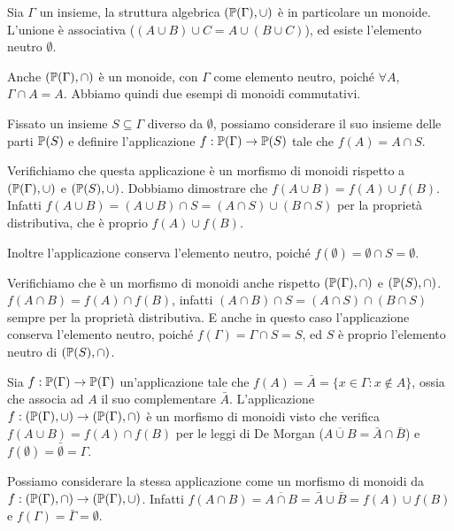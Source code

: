 \begin{exmp}
Sia $\Gamma$ un insieme, la struttura algebrica $\left( \mathbb{P}(\Gamma), \cup \right)$ \`e in particolare un monoide. L'unione \`e associativa ($(A \cup B) \cup C = A \cup (B \cup C)$), ed esiste l'elemento neutro $\emptyset$.

Anche $\left( \mathbb{P}(\Gamma), \cap \right)$ \`e un monoide, con $\Gamma$ come elemento neutro, poich\'e $\forall A$, $\Gamma \cap A = A$. Abbiamo quindi due esempi di monoidi commutativi.

Fissato un insieme $S \subseteq \Gamma$ diverso da $\emptyset$, possiamo considerare il suo insieme delle parti $\mathbb{P}(S)$ e definire l'applicazione $f : \mathbb{P}(\Gamma) \to \mathbb{P}(S)$ tale che $f(A) = A \cap S$. 

Verifichiamo che questa applicazione \`e un morfismo di monoidi rispetto a $\left( \mathbb{P}(\Gamma), \cup \right)$ e $\left( \mathbb{P}(S), \cup \right)$. Dobbiamo dimostrare che $f( A \cup B) = f(A) \cup f(B)$. Infatti $f(A \cup B) = (A \cup B) \cap S = (A \cap S) \cup (B \cap S)$ per la propriet\`a distributiva, che \`e proprio $f(A) \cup f(B)$.

Inoltre l'applicazione conserva l'elemento neutro, poich\'e $f(\emptyset) = \emptyset \cap S = \emptyset$.

Verifichiamo che \`e un morfismo di monoidi anche rispetto $\left( \mathbb{P}(\Gamma), \cap \right)$ e $\left( \mathbb{P}(S), \cap \right)$. $f(A \cap B) = f(A) \cap f(B)$, infatti $(A \cap B) \cap S = (A \cap S) \cap (B \cap S)$ sempre per la propriet\`a distributiva. E anche in questo caso l'applicazione conserva l'elemento neutro, poich\'e $f(\Gamma) = \Gamma \cap S = S$, ed $S$ \`e proprio l'elemento neutro di $\left( \mathbb{P}(S), \cap \right)$.
\end{exmp}

\begin{exmp}
Sia $f : \mathbb{P}(\Gamma) \to \mathbb{P}(\Gamma)$ un'applicazione tale che $f(A) = \bar{A} = \{ x \in \Gamma : x \notin A\}$, ossia che associa ad $A$ il suo complementare $\bar{A}$. L'applicazione $f : (\mathbb{P}(\Gamma), \cup) \to (\mathbb{P}(\Gamma), \cap)$ \`e un morfismo di monoidi visto che verifica $f(A \cup B) = f(A) \cap f(B)$ per le leggi di De Morgan ($\overline{A \cup B} = \bar{A} \cap \bar{B}$) e $f(\emptyset) = \bar{\emptyset} = \Gamma$.

Possiamo considerare la stessa applicazione come un morfismo di monoidi da $f : (\mathbb{P}(\Gamma), \cap) \to (\mathbb{P}(\Gamma), \cup)$. Infatti $f(A \cap B) = \overline{A \cap B} = \bar{A} \cup \bar{B} = f(A) \cup f(B)$ e $f(\Gamma) = \bar{\Gamma} = \emptyset$.
\end{exmp}

